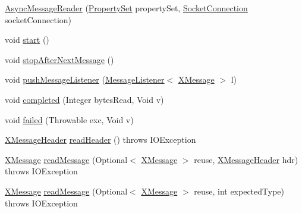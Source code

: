 \begin{DoxyCompactItemize}
\item 
\mbox{\hyperlink{classcom_1_1mysql_1_1cj_1_1protocol_1_1x_1_1_async_message_reader_a00db6ec79141ba00ebce6e28e146d11b}{Async\+Message\+Reader}} (\mbox{\hyperlink{interfacecom_1_1mysql_1_1cj_1_1conf_1_1_property_set}{Property\+Set}} property\+Set, \mbox{\hyperlink{interfacecom_1_1mysql_1_1cj_1_1protocol_1_1_socket_connection}{Socket\+Connection}} socket\+Connection)
\item 
void \mbox{\hyperlink{classcom_1_1mysql_1_1cj_1_1protocol_1_1x_1_1_async_message_reader_a703e921ede276cb42cb6088a40256eb4}{start}} ()
\item 
void \mbox{\hyperlink{classcom_1_1mysql_1_1cj_1_1protocol_1_1x_1_1_async_message_reader_a5d7ad4e6d2faa3d5fa7ca04feaf6070f}{stop\+After\+Next\+Message}} ()
\item 
void \mbox{\hyperlink{classcom_1_1mysql_1_1cj_1_1protocol_1_1x_1_1_async_message_reader_a04d85ade49b7e9bc20370600a526f5e6}{push\+Message\+Listener}} (\mbox{\hyperlink{interfacecom_1_1mysql_1_1cj_1_1protocol_1_1_message_listener}{Message\+Listener}}$<$ \mbox{\hyperlink{classcom_1_1mysql_1_1cj_1_1protocol_1_1x_1_1_x_message}{X\+Message}} $>$ l)
\item 
void \mbox{\hyperlink{classcom_1_1mysql_1_1cj_1_1protocol_1_1x_1_1_async_message_reader_a24e1c3793c356604d062932c4165b387}{completed}} (Integer bytes\+Read, Void v)
\item 
void \mbox{\hyperlink{classcom_1_1mysql_1_1cj_1_1protocol_1_1x_1_1_async_message_reader_a32777998d2ffe63d50fcaeaff9774c59}{failed}} (Throwable exc, Void v)
\item 
\mbox{\hyperlink{classcom_1_1mysql_1_1cj_1_1protocol_1_1x_1_1_x_message_header}{X\+Message\+Header}} \mbox{\hyperlink{classcom_1_1mysql_1_1cj_1_1protocol_1_1x_1_1_async_message_reader_a6c755b53680af84a699114422348db84}{read\+Header}} ()  throws I\+O\+Exception 
\item 
\mbox{\hyperlink{classcom_1_1mysql_1_1cj_1_1protocol_1_1x_1_1_x_message}{X\+Message}} \mbox{\hyperlink{classcom_1_1mysql_1_1cj_1_1protocol_1_1x_1_1_async_message_reader_afd39b008eb7407f677e2e36f6ac640a6}{read\+Message}} (Optional$<$ \mbox{\hyperlink{classcom_1_1mysql_1_1cj_1_1protocol_1_1x_1_1_x_message}{X\+Message}} $>$ reuse, \mbox{\hyperlink{classcom_1_1mysql_1_1cj_1_1protocol_1_1x_1_1_x_message_header}{X\+Message\+Header}} hdr)  throws I\+O\+Exception 
\item 
\mbox{\hyperlink{classcom_1_1mysql_1_1cj_1_1protocol_1_1x_1_1_x_message}{X\+Message}} \mbox{\hyperlink{classcom_1_1mysql_1_1cj_1_1protocol_1_1x_1_1_async_message_reader_a10b24093eb7fc6fdb4b5e3a68b0b18a2}{read\+Message}} (Optional$<$ \mbox{\hyperlink{classcom_1_1mysql_1_1cj_1_1protocol_1_1x_1_1_x_message}{X\+Message}} $>$ reuse, int expected\+Type)  throws I\+O\+Exception 
\end{DoxyCompactItemize}


